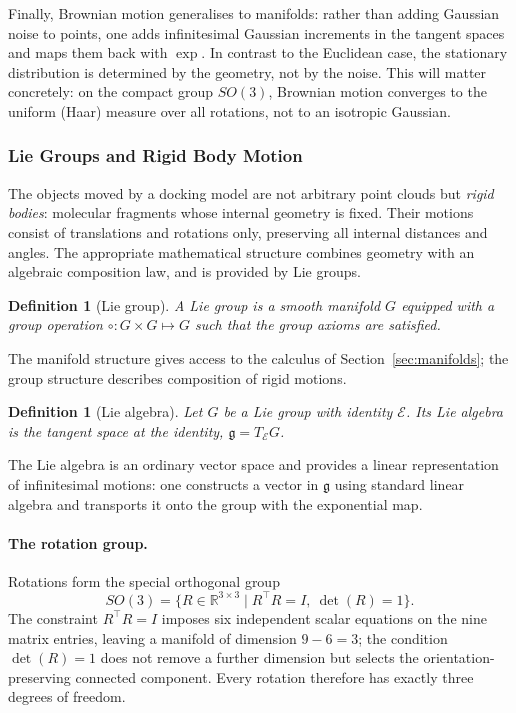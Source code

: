 \documentclass[a4paper,12pt]{article}
\newtheorem{definition}[theorem]{Definition}
\theoremstyle{remark}
\begin{document}
Finally, Brownian motion generalises to manifolds: rather than adding Gaussian noise to
points, one adds infinitesimal Gaussian increments in the tangent spaces and maps them
back with $\exp$. In contrast to the Euclidean case, the stationary distribution is
determined by the geometry, not by the noise. This will matter concretely: on the
compact group $SO(3)$, Brownian motion converges to the uniform (Haar) measure over all
rotations, not to an isotropic Gaussian.

\subsubsection{Lie Groups and Rigid Body Motion}
\label{sec:rigid}

The objects moved by a docking model are not arbitrary point clouds but \emph{rigid
bodies}: molecular fragments whose internal geometry is fixed. Their motions consist of
translations and rotations only, preserving all internal distances and angles. The
appropriate mathematical structure combines geometry with an algebraic composition law,
and is provided by Lie groups.

\begin{definition}[Lie group]
\label{def:liegroup}
A \emph{Lie group} is a smooth manifold $G$ equipped with a group operation
$\circ: G \times G \mapsto G$ such that the group axioms are satisfied.
\end{definition}

The manifold structure gives access to the calculus of Section~\ref{sec:manifolds};
the group structure describes composition of rigid motions.

\begin{definition}[Lie algebra]
\label{def:liealgebra}
Let $G$ be a Lie group with identity $\mathcal{E}$. Its \emph{Lie algebra} is the tangent space
at the identity, $\mathfrak g=T_\mathcal{E}G$.
\end{definition}

The Lie algebra is an ordinary vector space and provides a linear representation of
infinitesimal motions: one constructs a vector in $\mathfrak g$ using standard linear
algebra and transports it onto the group with the exponential map.

\paragraph{The rotation group.}
Rotations form the special orthogonal group
\[
SO(3)
=
\bigl\{
R\in\mathbb R^{3\times3}
\;\big|\;
R^\top R=I,\ \det(R)=1
\bigr\}.
\]
The constraint $R^\top R=I$ imposes six independent scalar equations on the nine matrix
entries, leaving a manifold of dimension $9-6=3$; the condition $\det(R)=1$ does not
remove a further dimension but selects the orientation-preserving connected component.
Every rotation therefore has exactly three degrees of freedom.
\end{document}
